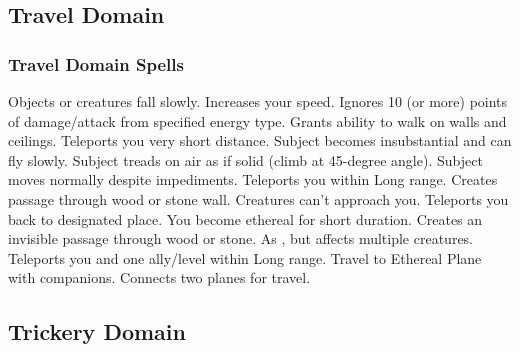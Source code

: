 \subsection{Travel Domain}

\subsubsection{Travel Domain Spells}
\begin{spelllist}
   Objects or creatures fall slowly.
   Increases your speed.
   Ignores 10 (or more) points of damage/attack from specified energy type.
   Grants ability to walk on walls and ceilings.
   Teleports you very short distance.
   Subject becomes insubstantial and can fly slowly.
   Subject treads on air as if solid (climb at 45-degree angle).
   Subject moves normally despite impediments.
   Teleports you within Long range.
   Creates passage through wood or stone wall.
   Creatures can't approach you.
   Teleports you back to designated place.
   You become ethereal for short duration.
   Creates an invisible passage through wood or stone.
   As , but affects multiple creatures.
   Teleports you and one ally/level within Long range.
   Travel to Ethereal Plane with companions.
   Connects two planes for travel.
\end{spelllist}

\subsection{Trickery Domain}
